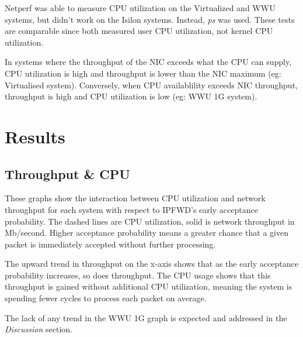 \documentclass[journal]{IEEEtran}
\begin{document}
    Netperf was able to measure CPU utilization on the Virtualized and WWU
    systems, but didn't work on the Isilon systems. Instead, \textit{ps} was
    used. These tests are comparable since both measured user CPU utilization,
    not kernel CPU utilization. 

    In systems where the throughput of the NIC exceeds what the CPU can supply,
    CPU utilization is high and throughput is lower than the NIC maximum (eg:
    Virtualised system). Conversely, when CPU availablility exceeds NIC
    throughput, throughput is high and CPU utilization is low (eg: WWU 1G
    system).


\section{Results}
  
  \subsection{Throughput \& CPU}

    These graphs show the interaction between CPU utilization and network
    throughput for each system with respect to IPFWD's early acceptance
    probability. The dashed lines are CPU utilization, solid is network
    throughput in Mb/second. Higher acceptance probability means a greater
    chance that a given packet is immediately accepted without further
    processing.

    The upward trend in throughput on the x-axis shows that as the early
    acceptance probability increases, so does throughput. The CPU usage shows
    that this throughput is gained without additional CPU utilization, meaning
    the system is spending fewer cycles to process each packet on average.

    The lack of any trend in the WWU 1G graph is expected and addressed in the
    \textit{Discussion} section.
    
\end{document}
